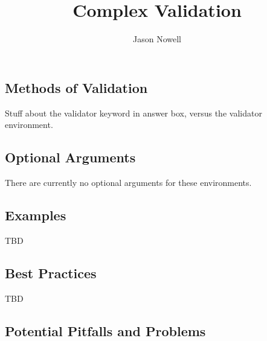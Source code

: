 \documentclass{ximera}
\title{Complex Validation}
\author{Jason Nowell}
\begin{document}
\begin{abstract}
\end{abstract}
\maketitle

    \subsection{Methods of Validation}
        Stuff about the validator keyword in answer box, versus the validator environment.
        
    \subsection*{Optional Arguments}
        There are currently no optional arguments for these environments.

    \subsection*{Examples}
    
        TBD
        
    \subsection*{Best Practices}
    
        TBD
        
    
    \subsection*{Potential Pitfalls and Problems}
    
\end{document}
